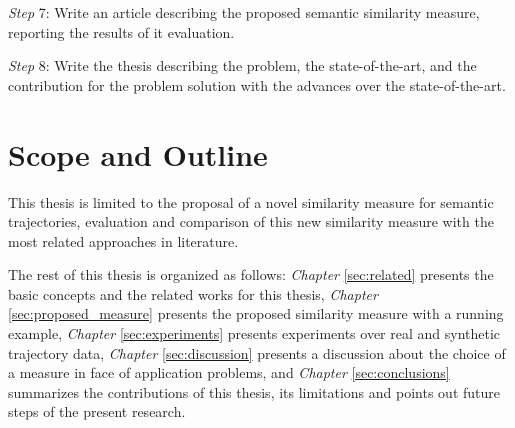 \textit{Step} 7: Write an article describing the proposed semantic similarity measure, reporting the results of it evaluation.

\textit{Step} 8: Write the thesis describing the problem, the state-of-the-art, and the contribution for the problem solution with the advances over the state-of-the-art.

\section{Scope and Outline}

This thesis is limited to the proposal of a novel similarity measure for semantic trajectories, evaluation and comparison of this new similarity measure with the most related approaches in literature. 

The rest of this thesis is organized as follows: \textit{Chapter} \ref{sec:related} presents the basic concepts and the related works for this thesis, \textit{Chapter} \ref{sec:proposed_measure} presents the proposed similarity measure with a running example, \textit{Chapter} \ref{sec:experiments} presents experiments over real and synthetic trajectory data, \textit{Chapter} \ref{sec:discussion} presents a discussion about the choice of a measure in face of application problems, and \textit{Chapter} \ref{sec:conclusions} summarizes the contributions of this thesis, its limitations and points out future steps of the present research.
